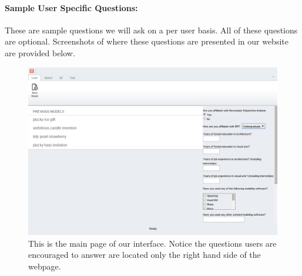 \documentclass[12pt]{article}
\begin{document}
\newpage
\paragraph{Sample User Specific Questions:}
These are sample questions we will ask on a per user basis. All of these
questions are optional. Screenshots of where these questions are presented in our website are provided below.

\begin{figure}[h]
\centering
\includegraphics[scale=0.4]{ss_load}
\caption{This is the main page of our interface. Notice the questions users are encouraged to answer are located only the right hand side of the webpage.}
\label{fig:sfig1}
\end{figure}
\end{document}
